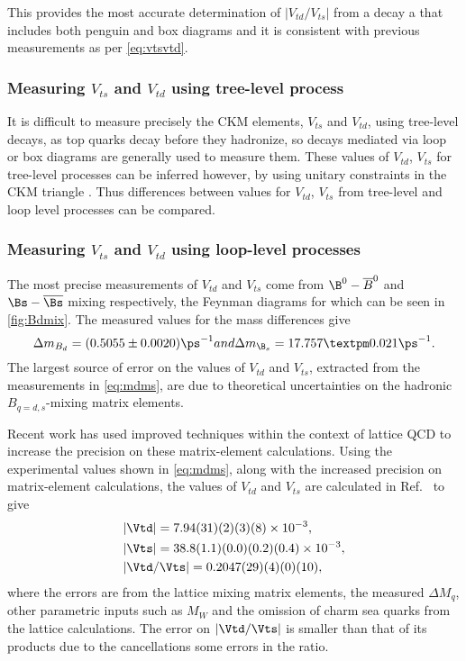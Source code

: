 This provides the most accurate determination of $|V_{td}/V_{ts}|$ from a decay a that includes both penguin and box diagrams and it is consistent with previous measurements as per \autoref{eq:vtsvtd}.


\subsubsection{Measuring $V_{ts}$ and $V_{td}$ using tree-level process}
It is difficult to measure precisely the CKM elements, $V_{ts}$ and $V_{td}$, using tree-level decays, as top quarks decay before they
hadronize,  so decays mediated via loop or box diagrams are generally used to
measure them. These values of $V_{td}$, $V_{ts}$ for tree-level
processes can be inferred however, by using unitary constraints
in the CKM triangle \cite{ckm}. Thus differences between values for $V_{td}$, $V_{ts}$ from tree-level and loop level processes can be compared. 
\subsubsection{Measuring $V_{ts}$ and $V_{td}$ using loop-level processes}
\label{subsubsec:loop}
The most precise measurements of $V_{td}$ and $V_{ts}$ come from
$\B^{0}-\overline{B}^{0}$ and $\Bs-\overline{\Bs}$ mixing
respectively, the Feynman diagrams for which can be seen in
\autoref{fig:Bdmix}.
The measured values for the mass differences give \cite{pdg} \cite{bslhcb}
\begin{equation}
  \Delta m_{B_{d}} = (0.5055\pm0.0020)\ps^{-1}  $$and$$
\Delta m_{\B_{s}} = 17.757 ± 0.021\ps^{-1}.
\label{eq:mdms}
\end{equation}
The largest source of error on the values of $V_{td}$ and $V_{ts}$,
extracted from the measurements in \autoref{eq:mdms}, are due to theoretical uncertainties on the hadronic $B_{q = d,s}$-mixing matrix elements.


Recent work \cite{vtdvts} has used improved
techniques within the context of lattice QCD to increase the
precision on these  matrix-element calculations. Using the
experimental values shown in \autoref{eq:mdms}, along with the
increased precision on matrix-element calculations, the values of
$V_{td}$ and $V_{ts}$ are calculated in Ref.~\cite{vtdvts} to give
\begin{equation}
  \begin{split}
    & |\Vtd| = 7.94(31)(2)(3)(8)\times 10^{-3},\\
& |\Vts| = 38.8(1.1)(0.0)(0.2)(0.4)\times 10^{-3},\\
& |\Vtd/\Vts| = 0.2047(29)(4)(0)(10),
  \end{split}
\end{equation}
where the errors are from the lattice mixing matrix elements, the measured $\Delta M_{q}$, other parametric inputs such as $M_{W}$ and the omission of charm sea quarks from the lattice calculations. The error on $|\Vtd/\Vts|$ is smaller than that of its products due to the cancellations some errors in the ratio.

